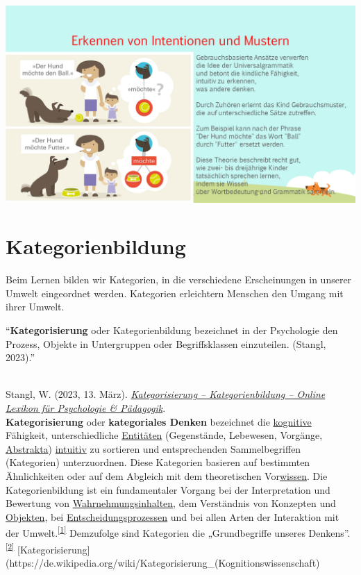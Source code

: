 \documentclass[
  letterpaper,
]{scrbook}
\begin{document}
\includegraphics[width=1\textwidth,height=\textheight]{./pictures/muster_intentionen/Diapozitiv8.PNG}

\hypertarget{kategorienbildung}{%
\section{Kategorienbildung}\label{kategorienbildung}}

Beim Lernen bilden wir Kategorien, in die verschiedene Erscheinungen in
unserer Umwelt eingeordnet werden. Kategorien erleichtern Menschen den
Umgang mit ihrer Umwelt.

``\textbf{Kategorisierung} oder Kategorienbildung bezeichnet in der
Psychologie den Prozess, Objekte in Untergruppen oder Begriffsklassen
einzuteilen. (Stangl, 2023).''\\
\strut \\
Stangl, W. (2023, 13. März).
\href{https://lexikon.stangl.eu/7003/kategorisierung-kategorienbildung}{\emph{Kategorisierung
-- Kategorienbildung -- Online Lexikon für Psychologie \& Pädagogik}}.\\

\textbf{Kategorisierung} oder \textbf{kategoriales Denken} bezeichnet
die \href{https://de.wikipedia.org/wiki/Kognition}{kognitive} Fähigkeit,
unterschiedliche
\href{https://de.wikipedia.org/wiki/Entit\%C3\%A4t}{Entitäten}
(Gegenstände, Lebewesen, Vorgänge,
\href{https://de.wikipedia.org/wiki/Abstraktum}{Abstrakta})
\href{https://de.wikipedia.org/wiki/Intuition}{intuitiv} zu sortieren
und entsprechenden Sammelbegriffen (Kategorien) unterzuordnen. Diese
Kategorien basieren auf bestimmten Ähnlichkeiten oder auf dem Abgleich
mit dem theoretischen
Vor\href{https://de.wikipedia.org/wiki/Wissen}{wissen}. Die
Kategorienbildung ist ein fundamentaler Vorgang bei der Interpretation
und Bewertung von
\href{https://de.wikipedia.org/wiki/Wahrnehmung}{Wahrnehmungsinhalten},
dem Verständnis von Konzepten und
\href{https://de.wikipedia.org/wiki/Objekt_(Philosophie)}{Objekten}, bei
\href{https://de.wikipedia.org/wiki/Entscheidung}{Entscheidungsprozessen}
und bei allen Arten der Interaktion mit der
Umwelt.\textsuperscript{\href{https://de.wikipedia.org/wiki/Kategorisierung_(Kognitionswissenschaft)\#cite_note-Categorization-1}{{[}1{]}}}
Demzufolge sind Kategorien die „Grundbegriffe unseres
Denkens''.\textsuperscript{\href{https://de.wikipedia.org/wiki/Kategorisierung_(Kognitionswissenschaft)\#cite_note-Austeda-2}{{[}2{]}}}
{[}Kategorisierung{]}(https://de.wikipedia.org/wiki/Kategorisierung\_(Kognitionswissenschaft)
\end{document}
